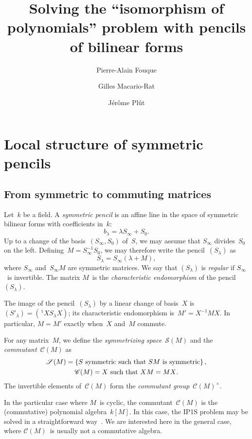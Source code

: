 \documentclass{article}%
\let\ro\mathscr
\def\transpose{\,{}^{\mathrm{t}\!}}
\def\acco#1{\left\{#1\right\}}
\begin{document}
\title{Solving the ``isomorphism of polynomials'' problem with pencils of
bilinear forms}
\author{Pierre-Alain Fouque \and Gilles Macario-Rat \and Jérôme Plût}
\maketitle

\section{Local structure of symmetric pencils}%
\subsection{From symmetric to commuting matrices}%

Let~$k$ be a field. A \emph{symmetric pencil} is an affine line in the
space of symmetric bilinear forms with coefficients in~$k$:
\begin{equation}
b_{λ} = λ S_{∞} + S_0.
\end{equation}
Up to a change of the basis~$(S_{∞}, S_{0})$ of~$S$, we may assume that
$S_{∞}$ divides~$S_0$ on the left. Defining~$M = S_{∞}^{-1} S_0^{}$, we
may therefore write the pencil~$(S_{λ})$ as
\begin{equation}
S_{λ} = S_{∞} (λ + M),
\end{equation}
where $S_{∞}$ and~$S_{∞} M$ are symmetric matrices. We say that
$(S_{λ})$ is \emph{regular} if $S_{∞}$~is invertible. The matrix $M$~is the
\emph{characteristic endomorphism} of the pencil~$(S_{λ})$.

The image of the pencil~$(S_{λ})$ by a linear change of basis~$X$
is~$(S'_{λ}) = (\transpose{X} S_{λ} X)$; its characteristic endomorphism
is~$M' = X^{-1} M X$. In particular, $M = M'$ exactly when~$X$ and~$M$
commute.


For any matrix~$M$, we define the \emph{symmetrizing space}~$\ro S(M)$
and the \emph{commutant}~$\ro C(M)$ as
\begin{gather}
\ro S(M) = \acco{\text{$S$ symmetric such that $SM$~is symmetric} },\\
\ro C(M) = \text{\text{$X$ such that~$XM = MX$}}.
\end{gather}
The invertible elements of~$\ro C(M)$ form the \emph{commutant
group}~$\ro C(M)^{×}$.

In the particular case where $M$~is cyclic, the commutant~$\ro C(M)$ is
the (commutative) polynomial algebra~$k[M]$. In this case, the IP1S
problem may be solved in a straightforward way~\cite{MPG2013}. We are
interested here in the general case, where $\ro C(M)$~is usually not a
commutative algebra.
\end{document}
